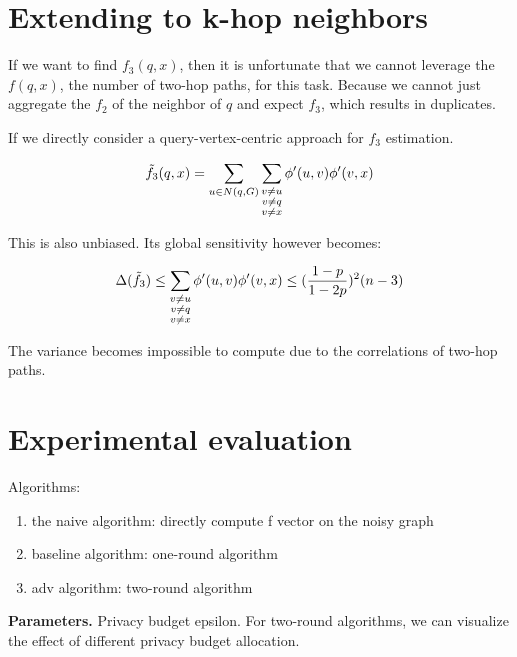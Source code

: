 

\section{ Extending to k-hop neighbors }

If we want to find $f_3(q, x)$, then it is unfortunate that we cannot leverage the $f(q, x)$, the number of two-hop paths, for this task. Because we cannot just aggregate the $f_2$ of the neighbor of $q$ and expect $f_3$, which results in duplicates. 

If we directly consider a query-vertex-centric approach for $f_3$ estimation. 

$$
\Tilde{f_3}(q, x) = \sum_{u \in N(q, G)} \sum_{ \substack{v \neq u \\ v \neq q \\ v \neq x   }} \phi'(u,v) \phi'(v,x)
$$

This is also unbiased. Its global sensitivity however becomes: 

$$
\Delta(\Tilde{f}_3) \leq \sum_{ \substack{v \neq u \\ v \neq q \\ v \neq x   }} \phi'(u,v) \phi'(v,x)
\leq (\frac{1-p}{1-2p})^2(n-3)
$$

The variance becomes impossible to compute due to the correlations of two-hop paths. 




\section{Experimental evaluation}
\label{sec:exp}




Algorithms: 

\begin{enumerate}
\item the naive algorithm: directly compute f vector on the noisy graph 
\item baseline algorithm: one-round algorithm
\item adv algorithm: two-round algorithm
\end{enumerate}


\noindent
{\bf Parameters.} 
Privacy budget epsilon. For two-round algorithms, we can visualize the effect of different privacy budget allocation. 


